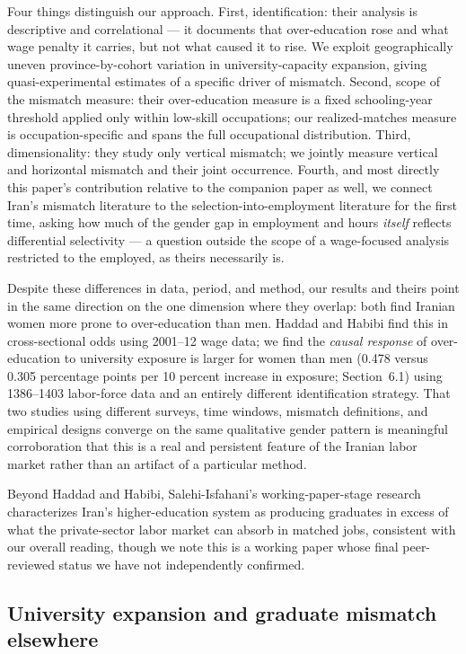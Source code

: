 \documentclass[11pt]{article}
\begin{document}
Four things distinguish our approach. First, identification: their analysis is descriptive and correlational --- it documents that over-education rose and what wage penalty it carries, but not what caused it to rise. We exploit geographically uneven province-by-cohort variation in university-capacity expansion, giving quasi-experimental estimates of a specific driver of mismatch. Second, scope of the mismatch measure: their over-education measure is a fixed schooling-year threshold applied only within low-skill occupations; our realized-matches measure is occupation-specific and spans the full occupational distribution. Third, dimensionality: they study only vertical mismatch; we jointly measure vertical and horizontal mismatch and their joint occurrence. Fourth, and most directly this paper's contribution relative to the companion paper as well, we connect Iran's mismatch literature to the selection-into-employment literature for the first time, asking how much of the gender gap in employment and hours \emph{itself} reflects differential selectivity --- a question outside the scope of a wage-focused analysis restricted to the employed, as theirs necessarily is.

Despite these differences in data, period, and method, our results and theirs point in the same direction on the one dimension where they overlap: both find Iranian women more prone to over-education than men. Haddad and Habibi find this in cross-sectional odds using 2001--12 wage data; we find the \emph{causal response} of over-education to university exposure is larger for women than men (0.478 versus 0.305 percentage points per 10 percent increase in exposure; Section~6.1) using 1386--1403 labor-force data and an entirely different identification strategy. That two studies using different surveys, time windows, mismatch definitions, and empirical designs converge on the same qualitative gender pattern is meaningful corroboration that this is a real and persistent feature of the Iranian labor market rather than an artifact of a particular method.

Beyond Haddad and Habibi, Salehi-Isfahani's working-paper-stage research characterizes Iran's higher-education system as producing graduates in excess of what the private-sector labor market can absorb in matched jobs, consistent with our overall reading, though we note this is a working paper whose final peer-reviewed status we have not independently confirmed.

\subsection{University expansion and graduate mismatch elsewhere}
\end{document}
